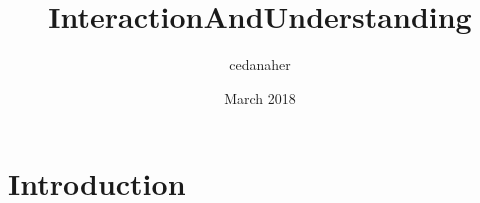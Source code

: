 \documentclass{article}
\title{InteractionAndUnderstanding}
\author{cedanaher }
\date{March 2018}
\begin{document}
\maketitle

\section{Introduction}
\end{document}
